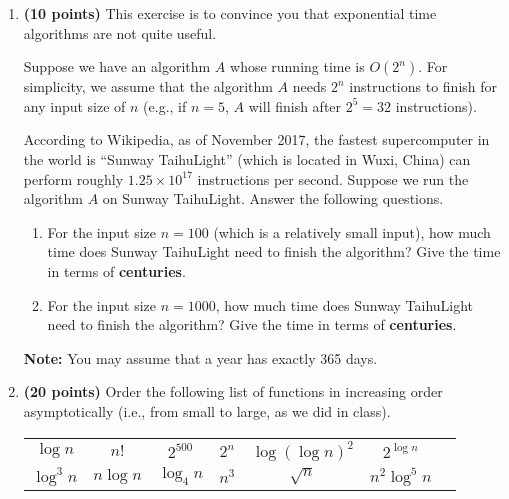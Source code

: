 \documentclass[11pt]{article}
\begin{document}
\begin{enumerate}

\item
{ \bf (10 points)}
This exercise is to convince you that exponential time algorithms are not quite useful.

Suppose we have an algorithm $A$ whose running time is $O(2^{n})$. For simplicity, we assume that the algorithm $A$ needs $2^n$ instructions to finish for any input size of $n$ (e.g., if $n=5$, $A$ will finish after $2^5=32$ instructions).

According to Wikipedia, as of November 2017, the fastest supercomputer in the world is ``Sunway TaihuLight'' (which is located in Wuxi, China) can perform roughly $1.25 \times 10^{17}$ instructions per second.
Suppose we run the algorithm $A$ on Sunway TaihuLight. Answer the following questions.


\begin{enumerate}

\item
For the input size $n=100$ (which is a relatively small input), how much time does Sunway TaihuLight need to finish the algorithm? Give the time in terms of {\bf centuries}.

\item
For the input size $n=1000$, how much time does Sunway TaihuLight need to finish the algorithm? Give the time in terms of {\bf centuries}.
\end{enumerate}

{\bf Note:} You may assume that a year has exactly 365 days.

\item
{\bf (20 points)}
Order the following list of functions in increasing order asymptotically (i.e., from small to large, as we did in class).


\begin{table}[h]
\begin{center}
\begin{tabular}{ccccccc}
	$\log n$ & $n!$ & $2^{500}$ &  $2^n$ & $\log(\log n)^2$
					& $2^{\log n}$\\
$\log^3n$  & $n\log n$   &  $\log_4n$   & $n^3$   &
$\sqrt{n}$  & $n^2\log^5 n$  \\
\end{tabular}
\end{center}
\vspace{-0.2in}
\end{table}




\end{enumerate}
\end{document}
